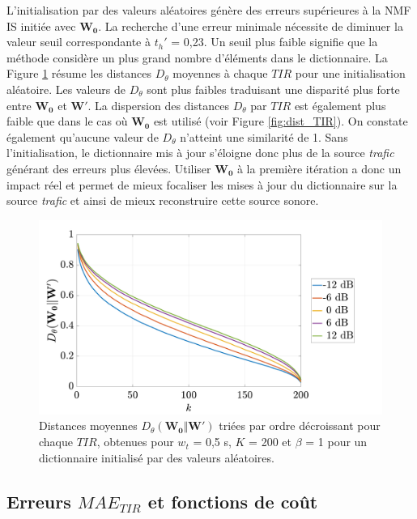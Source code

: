 L'initialisation par des valeurs aléatoires génère des erreurs supérieures à la NMF IS initiée avec $\mathbf{W_0}$. La recherche d'une erreur minimale nécessite de diminuer la valeur seuil correspondante à $t_h'$ = 0,23. Un seuil plus faible signifie que la méthode considère un plus grand nombre d'éléments dans le dictionnaire. La Figure \ref{fig:distRand} résume les distances $D_{\theta}$ moyennes à chaque $TIR$ pour une initialisation aléatoire.
Les valeurs de $D_{\theta}$ sont plus faibles traduisant une disparité plus forte entre $\mathbf{W_0}$ et $\mathbf{W'}$. La dispersion des distances $D_{\theta}$ par $TIR$ est également plus faible que dans le cas où $\mathbf{W_0}$ est utilisé (voir Figure \ref{fig:dist_TIR}). On constate également qu'aucune valeur de $D_{\theta}$ n'atteint une similarité de 1. Sans l'initialisation, le dictionnaire mis à jour s'éloigne donc plus de la source \textit{trafic} générant des erreurs plus élevées. Utiliser $\mathbf{W_0}$ à la première itération a donc un impact réel et permet de mieux focaliser les mises à jour du dictionnaire sur la source \textit{trafic} et ainsi de mieux reconstruire cette source sonore.


\begin{figure}[h]
\centering
\includegraphics[width=.8\linewidth]{./figures/resultats/distRAND_TIR.pdf}
\caption{Distances moyennes $D_{\theta}(\mathbf{W_0} \Vert \mathbf{W'})$ triées par ordre décroissant pour chaque $TIR$,  obtenues pour $w_t$ = 0,5 s, $K$ = 200 et $\beta$ = 1 pour un dictionnaire initialisé par des valeurs aléatoires.}
\label{fig:distRand}
\end{figure}

\subsection{Erreurs $MAE_{TIR}$ et fonctions de coût}

